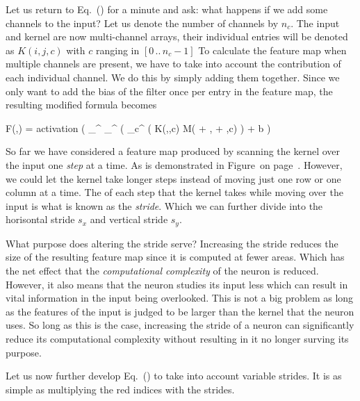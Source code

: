 \startsubsubsection[title=Multiple channels]
Let us return to Eq.~() for a minute and ask: what happens if we add some channels to the input?
Let us denote the number of channels by $n_c$.
The input and kernel are now multi-channel arrays, their individual entries will be denoted as $K(i,j,c)$ with $c$ ranging in $[0 \, .. \, n_c - 1]$
To calculate the feature map when multiple channels are present, we have to take into account the contribution of each individual channel.
We do this by simply adding them together.
Since we only want to add the bias of the filter once per entry in the feature map, the resulting modified formula becomes

\startplaceformula[reference=devel-feature-4]
\startformula
F(\color[red]{x},\color[red]{y})
=
{\rm activation}
\left( 
\sum_{\color[blue]{y}}^{}
\sum_{\color[blue]{x}}^{}
\left(
\sum_{c}^{}
\Bigl(
K(\color[blue]{x},\color[blue]{y},c)
\cdot
M(\color[red]{x} + \color[blue]{x}, \color[red]{y} + \color[blue]{y},c)
\right)
+
b
\right)
\stopformula
\stopplaceformula
\stopsubsubsection

\startsubsubsection[title=The stride]
So far we have considered a feature map produced by scanning the kernel over the input one {\em step} at a time.
As is demonstrated in Figure~ on page~.
However, we could let the kernel take longer steps instead of moving just one row or one column at a time.
The  of each step that the kernel takes while moving over the input is what is known as the {\em stride}.
Which we can further divide into the horisontal stride $s_x$ and vertical stride $s_y$.

What purpose does altering the stride serve?
Increasing the stride reduces the size of the resulting feature map since it is computed at fewer areas.
Which has the net effect that the {\em computational complexity} of the neuron is reduced.
However, it also means that the neuron studies its input less which can result in vital information in the input being overlooked.
This is not a big problem as long as the features of the input is judged to be larger than the kernel that the neuron uses.
So long as this is the case, increasing the stride of a neuron can significantly reduce its computational complexity without resulting in it no longer surving its purpose.

Let us now further develop Eq.~() to take into account variable strides.
It is as simple as multiplying the red indices with the strides.

